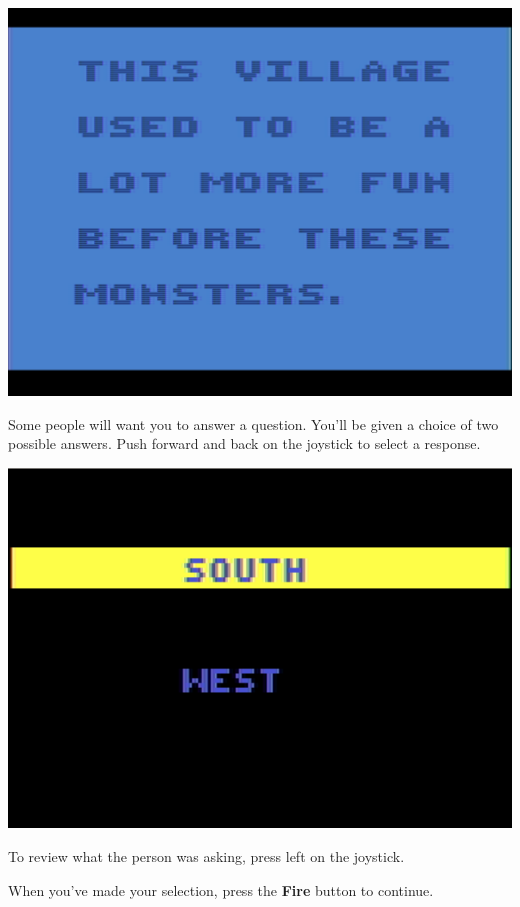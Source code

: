 \documentclass[10pt,twocolumn,openany,article]{memoir}
\begin{document}
\begin{center}
  \includegraphics[width=\columnwidth]{../Manual/TextNTSC.png}
\end{center}

Some people will want you to answer a question. You'll be given a choice
of two possible answers. Push forward and back on the joystick to select
a response.

\begin{center}
  \includegraphics[width=\columnwidth]{../Manual/InquireNTSC.png}
\end{center}

To review  what  the  person  was  asking, press  left  on
the joystick.

When you've made your selection, press the \textbf{Fire} button to continue.
\end{document}
